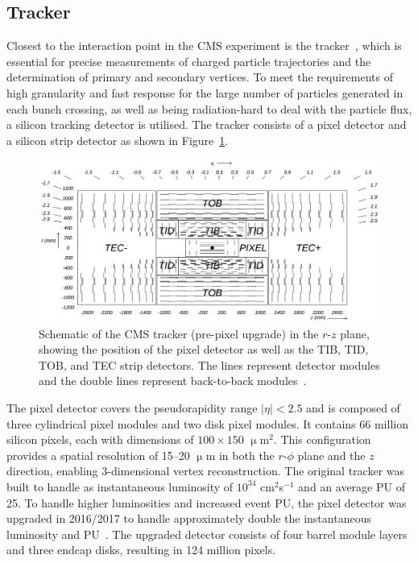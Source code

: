\subsection{Tracker}

Closest to the interaction point in the \ac{CMS} experiment is the tracker~\cite{CMS_Setup,Malberti:2014pda,CMS:2012sda}, which is essential for precise measurements of charged particle trajectories and the determination of primary and secondary vertices. 
To meet the requirements of high granularity and fast response for the large number of particles generated in each bunch crossing, as well as being radiation-hard to deal with the particle flux, a silicon tracking detector is utilised. 
The tracker consists of a pixel detector and a silicon strip detector as shown in Figure~\ref{fig:tracker}. \\

\begin{figure}[!hbtp]
    \centering
    \includegraphics[width=\textwidth]{Figures/tracker.png}
    \caption{Schematic of the CMS tracker (pre-pixel upgrade) in the $r$-$z$ plane, showing the position of the pixel detector as well as the TIB, TID, TOB, and TEC strip detectors. The lines represent detector modules and the double lines represent back-to-back modules~\cite{CMS_Setup}.}
    \label{fig:tracker}
\end{figure}

The pixel detector covers the pseudorapidity range $|\eta| < 2.5$ and is composed of three cylindrical pixel modules and two disk pixel modules. 
It contains 66 million silicon pixels, each with dimensions of $100 \times 150$ $\upmu$m${^2}$. 
This configuration provides a spatial resolution of 15--20 $\upmu$m in both the $r$-$\phi$ plane and the $z$ direction, enabling 3-dimensional vertex reconstruction.
The original tracker was built to handle as instantaneous luminosity of $10^{34}$ cm$^{2}$s$^{-1}$ and an average \ac{PU} of 25.
To handle higher luminosities and increased event \ac{PU}, the pixel detector was upgraded in 2016/2017 to handle approximately double the instantaneous luminosity and \ac{PU}~\cite{CMS:2012sda}. 
The upgraded detector consists of four barrel module layers and three endcap disks, resulting in 124 million pixels. \\

